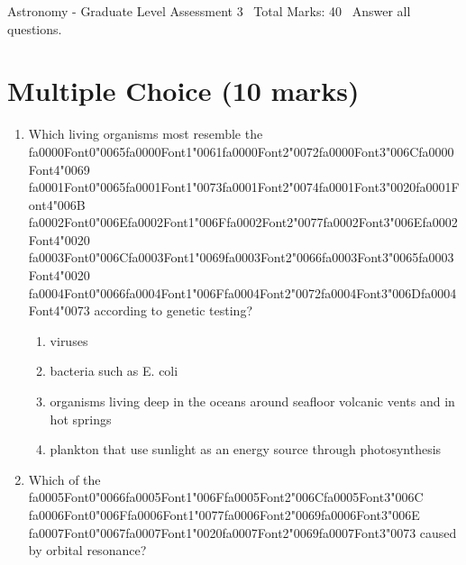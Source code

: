 \documentclass[12pt]{article}
\begin{document}
\begin{center}
Astronomy - Graduate Level Assessment 3 \
Total Marks: 40 \
Answer all questions.
\end{center}

\section*{Multiple Choice (10 marks)}
\begin{enumerate}[label=\arabic*.]
\item Which living organisms most resemble the {\csname fa0000Font0\endcsname\char"0065}{\csname fa0000Font1\endcsname\char"0061}{\csname fa0000Font2\endcsname\char"0072}{\csname fa0000Font3\endcsname\char"006C}{\csname fa0000Font4\endcsname\char"0069} {\csname fa0001Font0\endcsname\char"0065}{\csname fa0001Font1\endcsname\char"0073}{\csname fa0001Font2\endcsname\char"0074}{\csname fa0001Font3\endcsname\char"0020}{\csname fa0001Font4\endcsname\char"006B} {\csname fa0002Font0\endcsname\char"006E}{\csname fa0002Font1\endcsname\char"006F}{\csname fa0002Font2\endcsname\char"0077}{\csname fa0002Font3\endcsname\char"006E}{\csname fa0002Font4\endcsname\char"0020} {\csname fa0003Font0\endcsname\char"006C}{\csname fa0003Font1\endcsname\char"0069}{\csname fa0003Font2\endcsname\char"0066}{\csname fa0003Font3\endcsname\char"0065}{\csname fa0003Font4\endcsname\char"0020} {\csname fa0004Font0\endcsname\char"0066}{\csname fa0004Font1\endcsname\char"006F}{\csname fa0004Font2\endcsname\char"0072}{\csname fa0004Font3\endcsname\char"006D}{\csname fa0004Font4\endcsname\char"0073} according to genetic
testing?
\begin{enumerate}[label=(\alph*)]
    \item viruses
    \item bacteria such as E. coli
    \item organisms living deep in the oceans around seafloor volcanic vents and in hot springs
    \item plankton that use sunlight as an energy source through photosynthesis
\end{enumerate}
\item Which of the {\csname fa0005Font0\endcsname\char"0066}{\csname fa0005Font1\endcsname\char"006F}{\csname fa0005Font2\endcsname\char"006C}{\csname fa0005Font3\endcsname\char"006C} {\csname fa0006Font0\endcsname\char"006F}{\csname fa0006Font1\endcsname\char"0077}{\csname fa0006Font2\endcsname\char"0069}{\csname fa0006Font3\endcsname\char"006E} {\csname fa0007Font0\endcsname\char"0067}{\csname fa0007Font1\endcsname\char"0020}{\csname fa0007Font2\endcsname\char"0069}{\csname fa0007Font3\endcsname\char"0073} caused by orbital resonance?

\end{enumerate}
\end{document}

